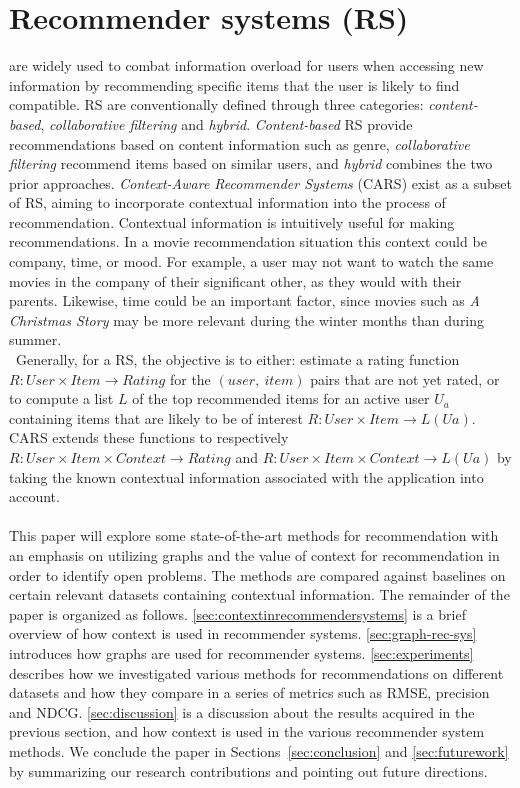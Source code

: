 \chapter{Recommender systems (RS)}\label{ch:introduction}
are widely used to combat information overload for users when accessing new information by recommending specific items that the user is likely to find compatible\cite{YouTubeNeural,IndustryPerspective}.
RS are conventionally defined through three categories: \textit{content-based}, \textit{collaborative filtering} and \textit{hybrid}.
\textit{Content-based} RS provide recommendations based on content information such as genre, \textit{collaborative filtering} recommend items based on similar users, and \textit{hybrid} combines the two prior approaches\cite{ContextSurvey2020}.
\textit{Context-Aware Recommender Systems} (CARS) exist as a subset of RS, aiming to incorporate contextual information into the process of recommendation.
Contextual information is intuitively useful for making recommendations.
In a movie recommendation situation this context could be company, time, or mood.
For example, a user may not want to watch the same movies in the company of their significant other, as they would with their parents.
Likewise, time could be an important factor, since movies such as \textit{A Christmas Story} may be more relevant during the winter months than during summer.\\\
Generally, for a RS, the objective is to either: estimate a rating function $R: User \times Item \rightarrow Rating$ for the $(user, \ item)$ pairs that are not yet rated, or to compute a list $L$ of the top recommended items for an active user $U_a$ containing items that are likely to be of interest $R: User \times Item \rightarrow L(Ua)$\cite{RecommenderHandbook2015}.
CARS extends these functions to respectively $R: User \times Item \times Context \rightarrow Rating$ and $R: User \times Item \times Context \rightarrow L(Ua)$ by taking the known contextual information associated with the application into account.
\\\\
This paper will explore some state-of-the-art methods for recommendation with an emphasis on utilizing graphs and the value of context for recommendation in order to identify open problems.
The methods are compared against baselines on certain relevant datasets containing contextual information.
The remainder of the paper is organized as follows. 
\autoref{sec:contextinrecommendersystems} is a brief overview of how context is used in recommender systems.
\autoref{sec:graph-rec-sys} introduces how graphs are used for recommender systems.
\autoref{sec:experiments} describes how we investigated various methods for recommendations on different datasets and how they compare in a series of metrics such as RMSE, precision and NDCG.
\autoref{sec:discussion} is a discussion about the results acquired in the previous section, and how context is used in the various recommender system methods.
We conclude the paper in Sections~\ref{sec:conclusion} and \ref{sec:futurework} by summarizing our research contributions and pointing out future directions.
